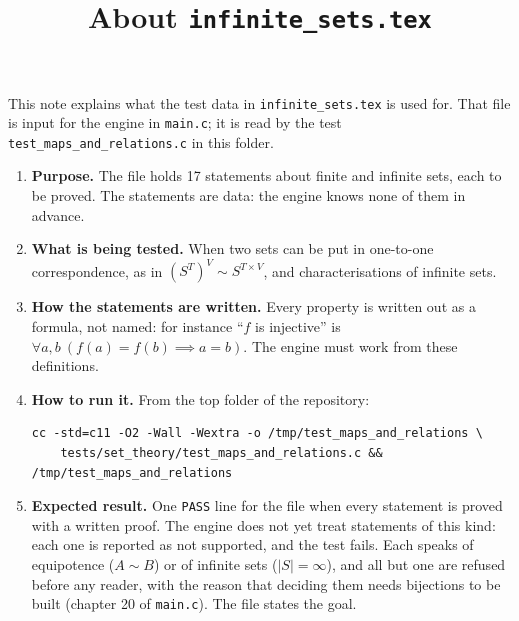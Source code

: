 \documentclass[11pt,a4paper]{article}
\title{About \texttt{infinite\_sets.tex}}
\author{}
\date{}
\begin{document}
\maketitle
This note explains what the test data in \texttt{infinite\_sets.tex} is used for. That file is input for the engine in \texttt{main.c}; it is read by the test \texttt{test\_maps\_and\_relations.c} in this folder.

\begin{enumerate}
\item \textbf{Purpose.} The file holds 17 statements about finite and infinite sets, each to be proved. The statements are data: the engine knows none of them in advance.

\item \textbf{What is being tested.} When two sets can be put in one-to-one correspondence, as in $(S^{T})^{V} \sim S^{T \times V}$, and characterisations of infinite sets.

\item \textbf{How the statements are written.} Every property is written out as a formula, not named: for instance ``$f$ is injective'' is $\forall a, b\ (f(a) = f(b) \implies a = b)$. The engine must work from these definitions.

\item \textbf{How to run it.} From the top folder of the repository:
\begin{verbatim}
cc -std=c11 -O2 -Wall -Wextra -o /tmp/test_maps_and_relations \
    tests/set_theory/test_maps_and_relations.c && /tmp/test_maps_and_relations
\end{verbatim}

\item \textbf{Expected result.} One \texttt{PASS} line for the file when every statement is proved with a written proof. The engine does not yet treat statements of this kind: each one is reported as not supported, and the test fails. Each speaks of equipotence ($A \sim B$) or of infinite sets ($|S| = \infty$), and all but one are refused before any reader, with the reason that deciding them needs bijections to be built (chapter 20 of \texttt{main.c}). The file states the goal.
\end{enumerate}
\end{document}
